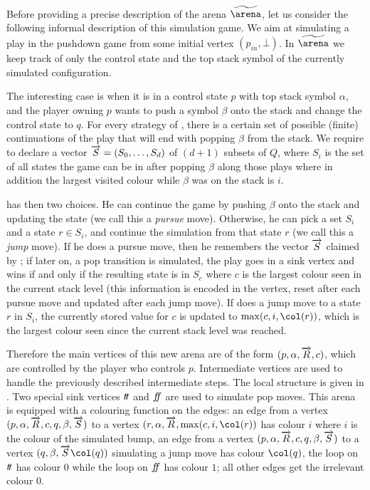 Before providing a precise description of the arena
$\farena$, let us consider the following informal description of
this simulation game. We aim at simulating a play in the pushdown game from some initial vertex $(p_{in},\bot)$. In $\farena$ we
keep track of only the control state and the top stack symbol of
the currently simulated configuration.

The interesting case is when it is in a control state $p$ with top
stack symbol $\alpha$, and the player owning $p$ wants to push a
symbol $\beta$ onto the stack and change the control state to $q$. For
every strategy of \Eve, there is a certain set of possible
(finite) continuations of the play that will end with popping
$\beta$ from the stack. We require \Eve to declare a vector
$\overrightarrow{S}=(S_0,\dots,S_d)$ of $(d+1)$ subsets of
$Q$, where $S_i$ is the set of all
states the game can be in after popping $\beta$ along those
plays where in addition the largest visited colour while $\beta$ was on
the stack is $i$.

\Adam has then two choices. He can continue the game by pushing
$\beta$ onto the stack and updating the state (we call this a
\emph{pursue} move). Otherwise, he can pick a set $S_i$
and a state $r\in S_i$, and
continue the simulation from that state $r$ (we call this a
\emph{jump} move). If he does a pursue move, then he remembers the
vector $\overrightarrow{S}$ claimed by \Eve; if later on, a pop transition is simulated, the play
goes in a sink vertex and \Eve wins if and only if the resulting state is in
$S_c$ where $c$ is the largest colour seen in
the current stack level (this information is encoded in the vertex, reset after each pursue move and updated after each jump
move). If \Adam
does a jump move to a state $r$ in $S_{i}$, the currently
stored value for $c$ is updated to $\max(c,i,\pdscol{r})$,
which is the largest colour seen since the current stack level was
reached.



Therefore the main vertices of this new arena are of the form $(p,\alpha,\overrightarrow{R},c)$, which are controlled by the player who controls $p$.
Intermediate vertices are used to handle the previously
described intermediate steps. The local structure is given in
. Two special sink vertices $t\! t$ and $f\!\! f$ are
used to simulate pop moves. This arena is equipped with a
colouring function on the edges: an edge from a vertex
$(p,\alpha,\overrightarrow{R},c,q,\beta,\overrightarrow{S})$ to a vertex $(r,\alpha,\vect{R},\max(c,i,\pdscol{r})$ has colour $i$ where $i$ is the colour of the simulated bump, an edge from a vertex
$(p,\alpha,\overrightarrow{R},c,q,\beta,\overrightarrow{S})$ to a vertex $(q,\beta,\vect{S}\pdscol{q})$ simulating a jump move has colour $\pdscol{q}$, the loop on $t\! t$ has colour $0$ while the loop on $f\!\! f$ has colour $1$; all other edges get the irrelevant colour $0$. 



